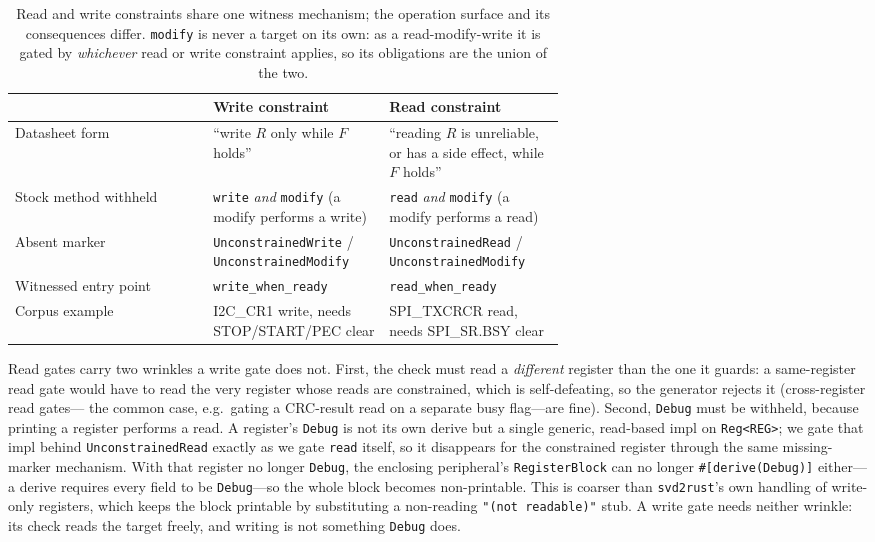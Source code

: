 \begin{table}[h]
\centering
\small
\begin{tabular}{@{}l p{0.32\linewidth} p{0.32\linewidth}@{}}
\toprule
 & Write constraint & Read constraint \\
\midrule
Datasheet form & ``write $R$ only while $F$ holds'' & ``reading $R$ is unreliable, or has a side effect, while $F$ holds'' \\
\addlinespace
Stock method withheld & \texttt{write} \emph{and} \texttt{modify} (a modify performs a write) & \texttt{read} \emph{and} \texttt{modify} (a modify performs a read) \\
\addlinespace
Absent marker & \texttt{UnconstrainedWrite} / \texttt{UnconstrainedModify} & \texttt{UnconstrainedRead} / \texttt{UnconstrainedModify} \\
\addlinespace
Witnessed entry point & \texttt{write\_when\_ready} & \texttt{read\_when\_ready} \\
\addlinespace
Corpus example & I2C\_CR1 write, needs STOP/START/PEC clear & SPI\_TXCRCR read, needs SPI\_SR.BSY clear \\
\bottomrule
\end{tabular}
\caption{Read and write constraints share one witness mechanism; the
operation surface and its consequences differ. \texttt{modify} is never a
target on its own: as a read-modify-write it is gated by \emph{whichever} read
or write constraint applies, so its obligations are the union of the two.}
\label{tab:read-write}
\end{table}

Read gates carry two wrinkles a write gate does not. First, the check must
read a \emph{different} register than the one it guards: a same-register read
gate would have to read the very register whose reads are constrained, which
is self-defeating, so the generator rejects it (cross-register read gates---%
the common case, e.g.\ gating a CRC-result read on a separate busy flag---are
fine). Second, \texttt{Debug} must be withheld, because printing a register
performs a read. A register's \texttt{Debug} is not its own derive but a
single generic, read-based impl on \texttt{Reg<REG>}; we gate that impl behind
\texttt{UnconstrainedRead} exactly as we gate \texttt{read} itself, so it
disappears for the constrained register through the same missing-marker
mechanism. With that register no longer \texttt{Debug}, the enclosing
peripheral's \texttt{RegisterBlock} can no longer \texttt{\#[derive(Debug)]}
either---a derive requires every field to be \texttt{Debug}---so the whole
block becomes non-printable. This is coarser than \texttt{svd2rust}'s own
handling of write-only registers, which keeps the block printable by
substituting a non-reading \texttt{"(not readable)"} stub. A write gate needs
neither wrinkle: its check reads the target freely, and writing is not
something \texttt{Debug} does.


